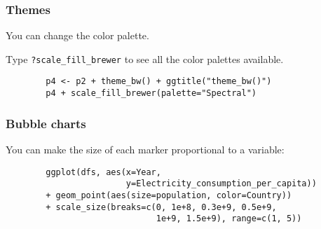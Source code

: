 \documentclass{beamer}
\begin{document}
	\begin{frame}[fragile]
		\frametitle{Themes}

		You can change the color palette.

		\vspace{2em}

		Type \verb|?scale_fill_brewer| to see all the color palettes available.

		\vspace{2em}

		\begin{exampleblock}{}
		\begin{BVerbatim}
		p4 <- p2 + theme_bw() + ggtitle("theme_bw()")
		p4 + scale_fill_brewer(palette="Spectral")
		\end{BVerbatim}
		\end{exampleblock}{}

	\end{frame}

	\begin{frame}[fragile]
		\frametitle{Bubble charts}

		You can make the size of each marker proportional to a variable:

		\vspace{2em}

		\begin{exampleblock}{}
		\begin{BVerbatim}
		ggplot(dfs, aes(x=Year,
		                y=Electricity_consumption_per_capita))
		+ geom_point(aes(size=population, color=Country))
		+ scale_size(breaks=c(0, 1e+8, 0.3e+9, 0.5e+9,
		                      1e+9, 1.5e+9), range=c(1, 5))
		\end{BVerbatim}
		\end{exampleblock}{}

	\end{frame}
\end{document}
